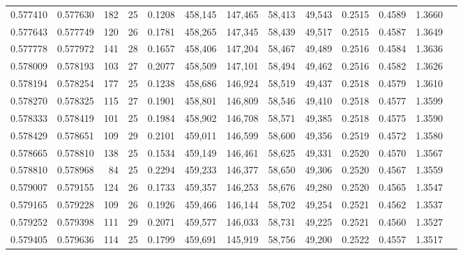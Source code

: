 \begin{tabular}{rrrrrrrrrrrrr}
0.577410 & 0.577630 &    182 &    25 &                                     0.1208 & 458,145 & 147,465 &  58,413 &  49,543 & 0.2515 & 0.4589 & 1.3660 \\
0.577643 & 0.577749 &    120 &    26 &                                     0.1781 & 458,265 & 147,345 &  58,439 &  49,517 & 0.2515 & 0.4587 & 1.3649 \\
0.577778 & 0.577972 &    141 &    28 &                                     0.1657 & 458,406 & 147,204 &  58,467 &  49,489 & 0.2516 & 0.4584 & 1.3636 \\
0.578009 & 0.578193 &    103 &    27 &                                     0.2077 & 458,509 & 147,101 &  58,494 &  49,462 & 0.2516 & 0.4582 & 1.3626 \\
0.578194 & 0.578254 &    177 &    25 &                                     0.1238 & 458,686 & 146,924 &  58,519 &  49,437 & 0.2518 & 0.4579 & 1.3610 \\
0.578270 & 0.578325 &    115 &    27 &                                     0.1901 & 458,801 & 146,809 &  58,546 &  49,410 & 0.2518 & 0.4577 & 1.3599 \\
0.578333 & 0.578419 &    101 &    25 &                                     0.1984 & 458,902 & 146,708 &  58,571 &  49,385 & 0.2518 & 0.4575 & 1.3590 \\
0.578429 & 0.578651 &    109 &    29 &                                     0.2101 & 459,011 & 146,599 &  58,600 &  49,356 & 0.2519 & 0.4572 & 1.3580 \\
0.578665 & 0.578810 &    138 &    25 &                                     0.1534 & 459,149 & 146,461 &  58,625 &  49,331 & 0.2520 & 0.4570 & 1.3567 \\
0.578810 & 0.578968 &     84 &    25 &                                     0.2294 & 459,233 & 146,377 &  58,650 &  49,306 & 0.2520 & 0.4567 & 1.3559 \\
0.579007 & 0.579155 &    124 &    26 &                                     0.1733 & 459,357 & 146,253 &  58,676 &  49,280 & 0.2520 & 0.4565 & 1.3547 \\
0.579165 & 0.579228 &    109 &    26 &                                     0.1926 & 459,466 & 146,144 &  58,702 &  49,254 & 0.2521 & 0.4562 & 1.3537 \\
0.579252 & 0.579398 &    111 &    29 &                                     0.2071 & 459,577 & 146,033 &  58,731 &  49,225 & 0.2521 & 0.4560 & 1.3527 \\
0.579405 & 0.579636 &    114 &    25 &                                     0.1799 & 459,691 & 145,919 &  58,756 &  49,200 & 0.2522 & 0.4557 & 1.3517 \\

\end{tabular}
